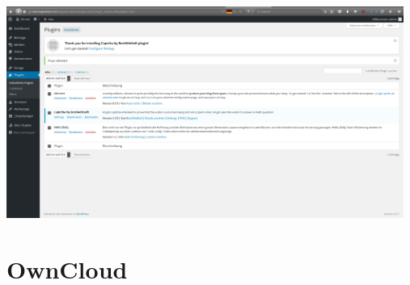 \documentclass{article}
\begin{document}
	\newline
	\includegraphics[width=13cm]{../Pics/41-wordpress-captcha_installed}
	\newline
	\section{OwnCloud}
\end{document}
